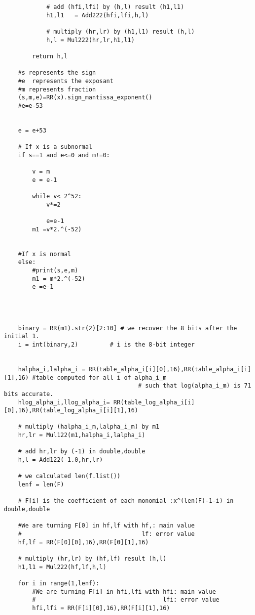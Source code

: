 \begin{lstlisting}
            # add (hfi,lfi) by (h,l) result (h1,l1)
            h1,l1   = Add222(hfi,lfi,h,l)

            # multiply (hr,lr) by (h1,l1) result (h,l)
            h,l = Mul222(hr,lr,h1,l1)
            
        return h,l

    #s represents the sign 
    #e  represents the exposant 
    #m represents fraction
    (s,m,e)=RR(x).sign_mantissa_exponent()
    #e=e-53 
    
    
    e = e+53
    
    # If x is a subnormal
    if s==1 and e<=0 and m!=0:
        
        v = m
        e = e-1
        
        while v< 2^52:
            v*=2
            
            e=e-1
        m1 =v*2.^(-52)
        

    #If x is normal
    else:
        #print(s,e,m)
        m1 = m*2.^(-52)
        e =e-1
    
    
    
    
    binary = RR(m1).str(2)[2:10] # we recover the 8 bits after the initial 1.
    i = int(binary,2)         # i is the 8-bit integer
    
    
    halpha_i,lalpha_i = RR(table_alpha_i[i][0],16),RR(table_alpha_i[i][1],16) #table computed for all i of alpha_i_m
                                      # such that log(alpha_i_m) is 71 bits accurate.
    hlog_alpha_i,llog_alpha_i= RR(table_log_alpha_i[i][0],16),RR(table_log_alpha_i[i][1],16)
    
    # multiply (halpha_i_m,lalpha_i_m) by m1
    hr,lr = Mul122(m1,halpha_i,lalpha_i)
    
    # add hr,lr by (-1) in double,double
    h,l = Add122(-1.0,hr,lr)
    
    # we calculated len(f.list())
    lenf = len(F)

    # F[i] is the coefficient of each monomial :x^(len(F)-1-i) in double,double
    
    #We are turning F[0] in hf,lf with hf,: main value
    #                                  lf: error value
    hf,lf = RR(F[0][0],16),RR(F[0][1],16)

    # multiply (hr,lr) by (hf,lf) result (h,l)
    h1,l1 = Mul222(hf,lf,h,l)
    
    for i in range(1,lenf):
        #We are turning F[i] in hfi,lfi with hfi: main value
        #                                    lfi: error value
        hfi,lfi = RR(F[i][0],16),RR(F[i][1],16)


\end{lstlisting}
